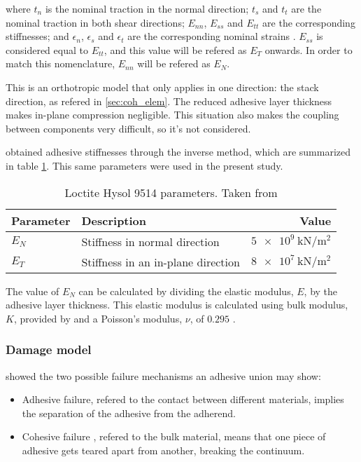 where $t_n$ is the nominal traction in the normal direction; $t_s$ and $t_t$ are the nominal traction in both shear directions; $E_{nn}$, $E_{ss}$ and $E_{tt}$ are the corresponding stiffnesses; and $\epsilon_n$, $\epsilon_s$ and $\epsilon_t$ are the corresponding nominal strains \citep{Abaqus613Manual}. $E_{ss}$ is considered equal to $E_{tt}$, and this value will be refered as $E_{T}$ onwards. In order to match this nomenclature, $E_{nn}$ will be refered as $E_{N}$.

This is an orthotropic model that only applies in one direction: the stack direction, as refered in \ref{sec:coh_elem}. The reduced adhesive layer thickness makes in-plane compression negligible. This situation also makes the coupling between components very difficult, so it's not considered.

\citet{Scattina2011} obtained adhesive stiffnesses through the inverse method, which are summarized in table \ref{tab:ads_params}. This same parameters were used in the present study.

\begin{table}
\begin{tabular}{llr}

 \toprule

 Parameter & Description & Value  \\

 \midrule

 $E_{N}$ & Stiffness in normal direction & $\SI{5e9}{\kN/\m^2}$ \\
 $E_{T}$ & Stiffness in an in-plane direction & $\SI{8e7}{\kN/\m^2}$ \\

 \bottomrule

\end{tabular}
\caption{Loctite Hysol 9514 parameters. Taken from \citet{Scattina2011}}
\label{tab:ads_params}
\end{table}

The value of $E_{N}$ can be calculated by dividing the elastic modulus, $E$, by the adhesive layer thickness. This elastic modulus is calculated using bulk modulus, $K$, provided by \citet{manufCatalog} and a Poisson's modulus, $\nu$, of $\num{0.295}$ \citep{JDiaz}.

\subsubsection{Damage model}
\citet{Wu2013} showed the two possible failure mechanisms an adhesive union may show: 
\begin{itemize}
\item Adhesive failure, refered to the contact between different materials, implies the separation of the adhesive from the adherend.
\item Cohesive failure \citep{Vaidya2006}, refered to the bulk material, means that one piece of adhesive gets teared apart from another, breaking the continuum.
\end{itemize}

